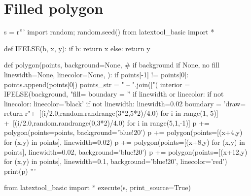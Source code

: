 \section{Filled polygon}

\begin{python}
s = r'''
import random; random.seed()
from latextool_basic import *

def IFELSE(b, x, y):
    if b: return x
    else: return y
    
def polygon(points,
            background=None, # if background if None, no fill
            linewidth=None,
            linecolor=None,
            ):
    if points[-1] != points[0]: points.append(points[0])
    points_str = " -- ".join(["(%
    interior = IFELSE(background, "fill=%
    boundary = ''
    if linewidth or linecolor:
        if not linecolor: linecolor='black'
        if not linewidth: linewidth=0.02
        boundary = 'draw=%
    return r" +\
         [(i/2.0,random.randrange(3*2,5*2)/4.0) for i in range(1, 5)] +\
         [(i/2.0,random.randrange(0,3*2)/4.0) for i in range(5,1,-1)]      
p += polygon(points=points, background='blue!20')
p += polygon(points=[(x+4,y) for (x,y) in points], linewidth=0.02)
p += polygon(points=[(x+8,y) for (x,y) in points], linewidth=0.02,
             background='blue!20')
p += polygon(points=[(x+12,y) for (x,y) in points], linewidth=0.1,
             background='blue!20', linecolor='red')
print(p)
'''

from latextool_basic import *
execute(s, print_source=True)
\end{python}
